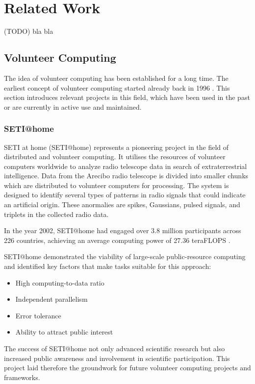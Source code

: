 \section{Related Work}
(TODO) bla bla

\subsection{Volunteer Computing}
The idea of volunteer computing has been established for a long time. The earliest concept of volunteer computing started already back in 1996 \cite{relatedwork:boinc1}. This section introduces relevant projects in this field, which have been used in the past or are currently in active use and maintained.

\subsubsection{SETI@home}
\label{subsec:background:related_work:seti}
\ac{SETI} at home (\ac{SETI}@home) represents a pioneering project in the field of distributed and volunteer computing. It utilises the resources of volunteer computers worldwide to analyze radio telescope data in search of extraterrestrial intelligence. Data from the Arecibo radio telescope is divided into smaller chunks which are distributed to volunteer computers for processing. The system is designed to identify several types of patterns in radio signals that could indicate an artificial origin. These anormalies are spikes, Gaussians, pulsed signals, and triplets in the collected radio data. \cite{relatedwork:seti}

In the year 2002, \ac{SETI}@home had engaged over 3.8 million participants across 226 countries, achieving an average computing power of 27.36 teraFLOPS \cite{relatedwork:seti}.

\ac{SETI}@home demonstrated the viability of large-scale public-resource computing and identified key factors that make tasks suitable for this approach:
\begin{itemize}
  \item High computing-to-data ratio
  \item Independent parallelism
  \item Error tolerance
  \item Ability to attract public interest
\end{itemize}
The success of \ac{SETI}@home not only advanced scientific research but also increased public awareness and involvement in scientific participation. This project laid therefore the groundwork for future volunteer computing projects and frameworks. \cite{relatedwork:seti}

